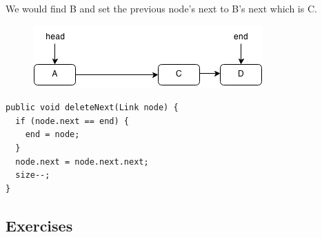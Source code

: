 \documentclass[11pt,oneside]{book}
\makeatletter
\def\maxwidth#1{\ifdim\Gin@nat@width>#1 #1\else\Gin@nat@width\fi}
\makeatother
\begin{document}
We would find B and set the previous node's next to B's next which is C.

\vspace{5px}\begin{figure}[H]\centering
        \includegraphics[width=0.66\maxwidth{\textwidth}]{linkedlistrem2.png}
        \end{figure}

\begin{lstlisting}
public void deleteNext(Link node) {
  if (node.next == end) {
    end = node;
  }
  node.next = node.next.next;
  size--;
}
\end{lstlisting}

\subsection{Exercises}
\end{document}
